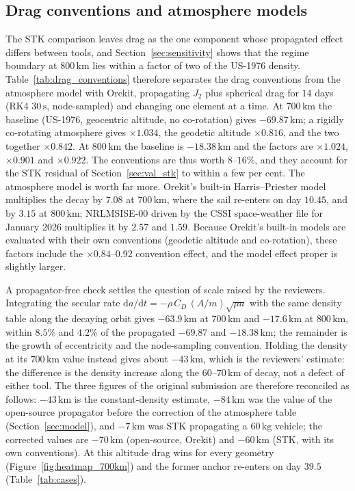 \subsection{Drag conventions and atmosphere models}
\label{sec:val_drag}
\noindent The STK comparison leaves drag as the one component whose propagated effect differs between tools, and Section~\ref{sec:sensitivity} shows that the regime boundary at \(800\,\mathrm{km}\) lies within a factor of two of the US-1976 density. Table~\ref{tab:drag_conventions} therefore separates the drag conventions from the atmosphere model with Orekit, propagating \(J_2\) plus spherical drag for \(14\) days (RK4 \(30\,\mathrm{s}\), node-sampled) and changing one element at a time. At \(700\,\mathrm{km}\) the baseline (US-1976, geocentric altitude, no co-rotation) gives \(-69.87\,\mathrm{km}\); a rigidly co-rotating atmosphere gives \(\times1.034\), the geodetic altitude \(\times0.816\), and the two together \(\times0.842\). At \(800\,\mathrm{km}\) the baseline is \(-18.38\,\mathrm{km}\) and the factors are \(\times1.024\), \(\times0.901\) and \(\times0.922\). The conventions are thus worth \(8\)--\(16\%\), and they account for the STK residual of Section~\ref{sec:val_stk} to within a few per cent. The atmosphere model is worth far more. Orekit's built-in Harris--Priester model multiplies the decay by \(7.08\) at \(700\,\mathrm{km}\), where the sail re-enters on day \(10.45\), and by \(3.15\) at \(800\,\mathrm{km}\); NRLMSISE-00 driven by the CSSI space-weather file for January 2026 multiplies it by \(2.57\) and \(1.59\). Because Orekit's built-in models are evaluated with their own conventions (geodetic altitude and co-rotation), these factors include the \(\times0.84\)--\(0.92\) convention effect, and the model effect proper is slightly larger.

\vspace{5pt}
\par\noindent A propagator-free check settles the question of scale raised by the reviewers. Integrating the secular rate \(\mathrm{d}a/\mathrm{d}t = -\rho\,C_D\,(A/m)\sqrt{\mu a}\) with the same density table along the decaying orbit gives \(-63.9\,\mathrm{km}\) at \(700\,\mathrm{km}\) and \(-17.6\,\mathrm{km}\) at \(800\,\mathrm{km}\), within \(8.5\%\) and \(4.2\%\) of the propagated \(-69.87\) and \(-18.38\,\mathrm{km}\); the remainder is the growth of eccentricity and the node-sampling convention. Holding the density at its \(700\,\mathrm{km}\) value instead gives about \(-43\,\mathrm{km}\), which is the reviewers' estimate: the difference is the density increase along the \(60\)--\(70\,\mathrm{km}\) of decay, not a defect of either tool. The three figures of the original submission are therefore reconciled as follows: \(-43\,\mathrm{km}\) is the constant-density estimate, \(-84\,\mathrm{km}\) was the value of the open-source propagator before the correction of the atmosphere table (Section~\ref{sec:model}), and \(-7\,\mathrm{km}\) was STK propagating a \(60\,\mathrm{kg}\) vehicle; the corrected values are \(-70\,\mathrm{km}\) (open-source, Orekit) and \(-60\,\mathrm{km}\) (STK, with its own conventions). At this altitude drag wins for every geometry (Figure~\ref{fig:heatmap_700km}) and the former anchor re-enters on day \(39.5\) (Table~\ref{tab:cases}).

